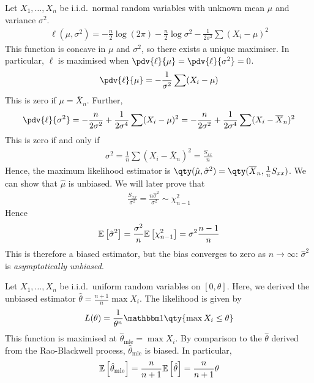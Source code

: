 \begin{example}
	Let $X_1, \dots, X_n$ be i.i.d.\ normal random variables with unknown mean $\mu$ and variance $\sigma^2$.
	\begin{align*}
		\ell(\mu, \sigma^2) = -\frac{n}{2} \log(2\pi) - \frac{n}{2} \log \sigma^2 - \frac{1}{2\sigma^2} \sum (X_i - \mu)^2
	\end{align*}
	This function is concave in $\mu$ and $\sigma^2$, so there exists a unique maximiser.
	In particular, $\ell$ is maximised when $\pdv{\ell}{\mu} = \pdv{\ell}{\sigma^2} = 0$.
	\begin{align*}
		\pdv{\ell}{\mu} = -\frac{1}{\sigma^2} \sum (X_i - \mu)
	\end{align*}
	This is zero if $\mu = \overline X_n$.
	Further,
	\begin{align*}
		\pdv{\ell}{\sigma^2} = -\frac{n}{2\sigma^2} + \frac{1}{2\sigma^4} \sum (X_i - \mu)^2 = -\frac{n}{2\sigma^2} + \frac{1}{2\sigma^4} \sum (X_i - \overline X_n)^2
	\end{align*}
	This is zero if and only if
	\begin{align*}
		\sigma^2 = \frac{1}{n} \sum (X_i - \overline X_n)^2 = \frac{S_{xx}}{n}
	\end{align*}
	Hence, the maximum likelihood estimator is $\qty(\hat \mu, \hat \sigma^2) = \qty(\overline X_n, \frac{1}{n} S_{xx})$.
	We can show that $\hat \mu$ is unbiased.
	We will later prove that
	\begin{align*}
		\frac{S_{xx}}{\sigma^2} = \frac{n\hat \sigma^2}{\sigma^2} \sim \chi_{n-1}^2
	\end{align*}
	Hence
	\begin{align*}
		\mathbb{E}\left[{\hat \sigma^2}\right] = \frac{\sigma^2}{n} \mathbb{E}\left[{\chi_{n-1}^2}\right] = \sigma^2 \frac{n-1}{n}
	\end{align*}
	This is therefore a biased estimator, but the bias converges to zero as $n \to \infty$: $\hat \sigma^2$ is \textit{asymptotically unbiased}.
\end{example}
\begin{example}
	Let $X_1, \dots, X_n$ be i.i.d.\ uniform random variables on $[0,\theta]$.
	Here, we derived the unbiased estimator $\hat \theta = \frac{n+1}{n} \max X_i$.
	The likelihood is given by
	\begin{align*}
		L(\theta) = \frac{1}{\theta^n} \mathbbm 1\qty{\max X_i \leq \theta}
	\end{align*}
	This function is maximised at $\hat \theta_{\mathrm{mle}} = \max X_i$.
	By comparison to the $\hat \theta$ derived from the Rao-Blackwell process, $\hat \theta_{\mathrm{mle}}$ is biased.
	In particular,
	\begin{align*}
		\mathbb{E}\left[{\hat \theta_{\mathrm{mle}}}\right] = \frac{n}{n+1} \mathbb{E}\left[{\hat \theta}\right] = \frac{n}{n+1} \theta
	\end{align*}
\end{example}
